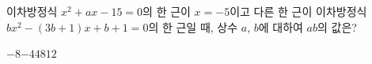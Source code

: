 이차방정식 $x^2+ax-15=0$의 한 근이 $x=-5$이고 다른 한 근이 이차방정식 $bx^2-(3b+1)x+b+1=0$의 한 근일 때, 상수 $a$, $b$에 대하여 $ab$의 값은?
\begin{choices32}{$-8$}{$-4$}{$4$}{$8$}{$12$}\end{choices32}
